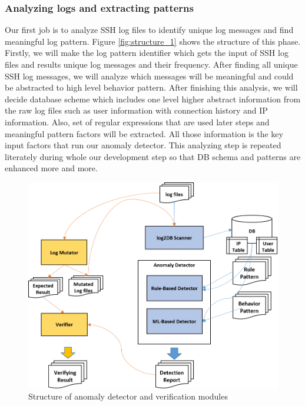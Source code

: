 \documentclass [11pt]{article}
\begin{document}
\subsubsection{Analyzing logs and extracting patterns}
Our first job is to analyze SSH log files to identify unique log messages and find meaningful log pattern. Figure \ref{fig:structure_1} shows the structure of this phase. Firstly, we will make the log pattern identifier which gets the input of SSH log files and results unique log messages and their frequency. After finding all unique SSH log messages, we will analyze which messages will be meaningful and could be abstracted to high level behavior pattern. After finishing this analysis, we will decide database scheme which includes one level higher abstract information from the raw log files such as user information with connection history and IP information. Also, set of regular expressions that are used later steps and meaningful pattern factors will be extracted. All those information is the key input factors that run our anomaly detector. This analyzing step is repeated literately during whole our development step so that DB schema and patterns are enhanced more and more.
\begin{figure}[b!]
\centering
\includegraphics[scale=0.7]{./figures/structure_2.png}
\caption{Structure of anomaly detector and verification modules}
\label{fig:structure_2}
\end{figure}
\end{document}
